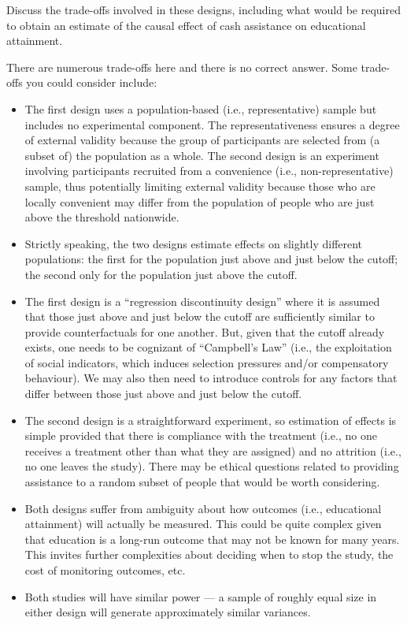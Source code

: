 \documentclass[a4paper,12pt]{exam}
\begin{document}
\begin{enumerate}
Discuss the trade-offs involved in these designs, including what would be required to obtain an estimate of the causal effect of cash assistance on educational attainment.

\begin{solution}

There are numerous trade-offs here and there is no correct answer. Some trade-offs you could consider include:

\begin{itemize}
\item The first design uses a population-based (i.e., representative) sample but includes no experimental component. The representativeness ensures a degree of external validity because the group of participants are selected from (a subset of) the population as a whole. The second design is an experiment involving participants recruited from a convenience (i.e., non-representative) sample, thus potentially limiting external validity because those who are locally convenient may differ from the population of people who are just above the threshold nationwide.
\item Strictly speaking, the two designs estimate effects on slightly different populations: the first for the population just above and just below the cutoff; the second only for the population just above the cutoff.
\item The first design is a ``regression discontinuity design'' where it is assumed that those just above and just below the cutoff are sufficiently similar to provide counterfactuals for one another. But, given that the cutoff already exists, one needs to be cognizant of ``Campbell's Law'' (i.e., the exploitation of social indicators, which induces selection pressures and/or compensatory behaviour). We may also then need to introduce controls for any factors that differ between those just above and just below the cutoff.
\item The second design is a straightforward experiment, so estimation of effects is simple provided that there is compliance with the treatment (i.e., no one receives a treatment other than what they are assigned) and no attrition (i.e., no one leaves the study). There may be ethical questions related to providing assistance to a random subset of people that would be worth considering.
\item Both designs suffer from ambiguity about how outcomes (i.e., educational attainment) will actually be measured. This could be quite complex given that education is a long-run outcome that may not be known for many years. This invites further complexities about deciding when to stop the study, the cost of monitoring outcomes, etc.
\item Both studies will have similar power --- a sample of roughly equal size in either design will generate approximately similar variances.
\end{itemize}
\end{solution}


\end{enumerate}
\end{document}
